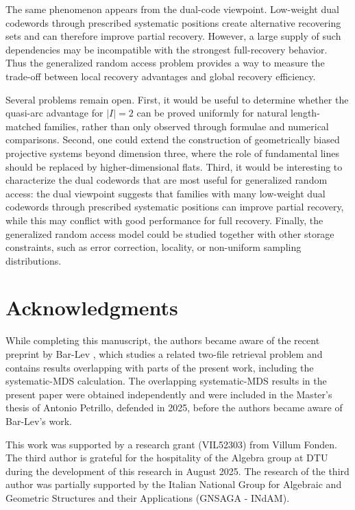 \documentclass[11pt,a4paper]{article}
\numberwithin{equation}{section}
\theoremstyle{definition}
\theoremstyle{definition}
\begin{document}
The same phenomenon appears from the dual-code viewpoint.  Low-weight dual codewords through prescribed systematic positions create alternative recovering sets and can therefore improve partial recovery.  However, a large supply of such dependencies may be incompatible with the strongest full-recovery behavior.  Thus the generalized random access problem provides a way to measure the trade-off between local recovery advantages and global recovery efficiency.

Several problems remain open.  First, it would be useful to determine whether the quasi-arc advantage for $|I|=2$ can be proved uniformly for natural length-matched families, rather than only observed through formulae and numerical comparisons.  Second, one could extend the construction of geometrically biased projective systems beyond dimension three, where the role of fundamental lines should be replaced by higher-dimensional flats.  Third, it would be interesting to characterize the dual codewords that are most useful for generalized random access: the dual viewpoint suggests that families with many low-weight dual codewords through prescribed systematic positions can improve partial recovery, while this may conflict with good performance for full recovery.  Finally, the generalized random access model could be studied together with other storage constraints, such as error correction, locality, or non-uniform sampling distributions.



\section*{Acknowledgments}
{While completing this manuscript, the authors became aware of the recent preprint by Bar-Lev \cite{BarLev2026CodedRetrieval}, which studies a related two-file retrieval problem and contains results overlapping with parts of the present work, including the systematic-MDS calculation.  The overlapping systematic-MDS results in the present paper were obtained independently and were included in the Master’s thesis of Antonio Petrillo, defended in 2025, before the authors became aware of Bar-Lev’s work.}

This work was supported by a research grant (VIL52303) from Villum Fonden.  The third author is grateful for the hospitality of the Algebra group at DTU during the development of this research in August 2025.  The research of the third author was partially supported by the Italian National Group for Algebraic and Geometric Structures and their Applications (GNSAGA - INdAM).
\end{document}

